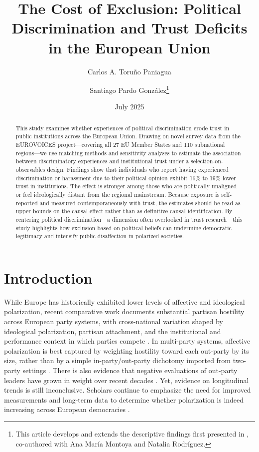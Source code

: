 \documentclass{article}
\title{The Cost of Exclusion: Political Discrimination and Trust Deficits in the European Union}
\author{Carlos A. Toruño Paniagua}
\author{Santiago Pardo González\footnote{This article develops and extends the descriptive findings first presented in \textcite{montoya2025trustbreakers}, co-authored with Ana María Montoya and Natalia Rodríguez.}}
\affil{\emph{The World Justice Project}}
\date{July 2025}
\begin{document}
\maketitle

\begin{abstract}
This study examines whether experiences of political discrimination erode trust in public institutions across the European Union. Drawing on novel survey data from the EUROVOICES project—covering all 27 EU Member States and 110 subnational regions—we use matching methods and sensitivity analyses to estimate the association between discriminatory experiences and institutional trust under a selection-on-observables design. Findings show that individuals who report having experienced discrimination or harassment due to their political opinion exhibit 16\% to 19\% lower trust in institutions. The effect is stronger among those who are politically unaligned or feel ideologically distant from the regional mainstream. Because exposure is self-reported and measured contemporaneously with trust, the estimates should be read as upper bounds on the causal effect rather than as definitive causal identification. By centering political discrimination—a dimension often overlooked in trust research—this study highlights how exclusion based on political beliefs can undermine democratic legitimacy and intensify public disaffection in polarized societies.
\end{abstract}

\section{Introduction}

While Europe has historically exhibited lower levels of affective and ideological polarization, recent comparative work documents substantial partisan hostility across European party systems, with cross-national variation shaped by ideological polarization, partisan attachment, and the institutional and performance context in which parties compete \parencite{reiljan_patterns_2024}. In multi-party systems, affective polarization is best captured by weighting hostility toward each out-party by its size, rather than by a simple in-party/out-party dichotomy imported from two-party settings \parencite{wagner_affective_2021}. There is also evidence that negative evaluations of out-party leaders have grown in weight over recent decades \parencite{garzia_negative_2021}. Yet, evidence on longitudinal trends is still inconclusive. Scholars continue to emphasize the need for improved measurements and long-term data to determine whether polarization is indeed increasing across European democracies \parencite{wagner_affective_2024, garzia_affective_2023}.
\end{document}
